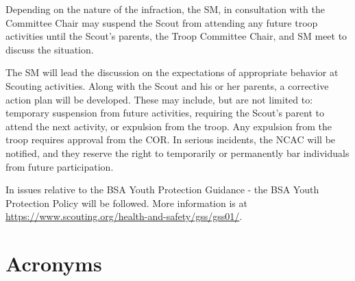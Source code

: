 \documentclass{ltxguide}
\begin{document}
Depending on the nature of the infraction, the \ac{SM}, in consultation with the Committee Chair may suspend the Scout from attending any future troop activities until the Scout's parents, the Troop Committee Chair, and \ac{SM} meet to discuss the situation.

The \ac{SM} will lead the discussion on the expectations of appropriate behavior     at Scouting activities. Along with the Scout and his or her parents, a corrective action plan will be developed. These may include, but are not limited to: temporary suspension from future activities, requiring the Scout's parent to attend the next activity, or expulsion from the troop. Any expulsion from the troop requires approval from the \ac{COR}. In serious incidents, the \ac{NCAC} will be notified, and they reserve the right to temporarily or permanently bar individuals from future participation.

In issues relative to the \ac{BSA} Youth Protection Guidance - the \ac{BSA} Youth Protection Policy will be followed. More information is at \url{https://www.scouting.org/health-and-safety/gss/gss01/}.



\section{Acronyms}
\begin{acronym}[XXXXXXX]
\end{acronym}
\end{document}
